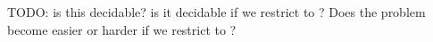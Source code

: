 TODO: is this decidable? is it decidable if we restrict to \Int ? Does the problem become easier or harder if we restrict to \Int ?










